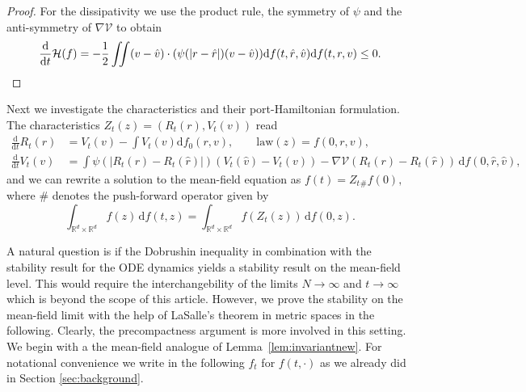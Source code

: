 \documentclass[11pt]{article}
\newcommand{\R}[0]{\mathbb R}
\newcommand{\calH}[0]{\mathcal H}
\newcommand{\calV}[0]{\mathcal V}
\newcommand{\dd}[0]{\mathrm d}
\begin{document}
\begin{bibunit}[abbrv]
\begin{proof}
For the dissipativity we use the product rule, the symmetry of $\psi$ and the anti-symmetry of $\nabla \calV$  to obtain  
\begin{equation*}
    \frac{\dd}{\dd t} \calH(f) 
    = -\frac12 \iint (v - \hat v) \cdot  ( \psi(|r - \hat r|)(v - \hat v)) \dd f(t,\hat r,\hat v) \dd f(t,r,v) 
    \le 0.\qedhere
\end{equation*}
\end{proof}

Next we investigate the characteristics and their port-Hamiltonian formulation. The characteristics $Z_t(z) = (R_t(r),V_t(v))$ read
\begin{subequations}\label{eq:PHSmf}
\begin{align}
\frac{\dd}{\dd t} R_t(r) &= V_t(v) - \int V_t(v) \dd f_0(r,v), \qquad \text{law}(z) = f(0,r,v),\\
\frac{\dd}{\dd t} V_t(v) &=  \int \psi(|R_t(r) - R_t(\hat r)|)( V_t(\hat v) - V_t(v)) - \nabla \mathcal V(R_t(r) - R_t(\hat r)) \,\dd f(0,\hat r,\hat v),
\end{align}
\end{subequations}
and we can rewrite a solution to the mean-field equation as $f(t) = Z_t{_\#} f(0),$ where $\#$ denotes the push-forward operator given by
\begin{equation*}
    \int_{\R^d \times \R^d} f(z)\, \dd f(t,z) = \int_{\R^d \times \R^d} f(Z_t(z))\, \dd f(0,z).
\end{equation*}

A natural question is if the Dobrushin inequality in combination with the stability result for the ODE dynamics yields a stability result on the mean-field level. This would require the interchangebility of the limits $N\rightarrow \infty$ and $t\rightarrow \infty$ which is beyond the scope of this article. However, we prove the stability on the mean-field limit with the help of LaSalle's theorem in metric spaces \cite[Theorem 3.2.11]{HiPr} in the following. Clearly, the precompactness argument is more involved in this setting. We begin with a the mean-field analogue of Lemma~\ref{lem:invariantnew}. For notational convenience we write in the following $f_t$ for $f(t,\cdot)$ as we already did in Section \ref{sec:background}.


\end{bibunit}
\end{document}
